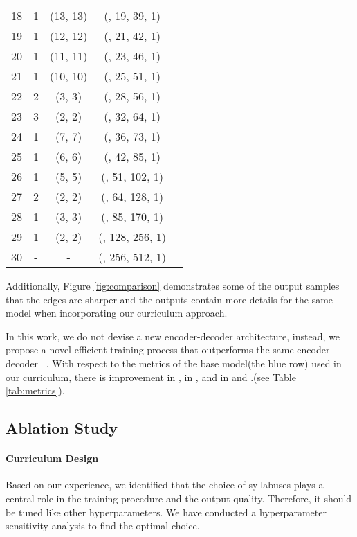 \documentclass{article}
\begin{document}
\begin{table}[H]
\begin{center}
\begin{tabular}{ccccc}
18         &1  &(13, 13)    &(, 19, 39, 1)& \\
19         &1  &(12, 12)    &(, 21, 42, 1)& \\
20         &1  &(11, 11)    &(, 23, 46, 1)& \\
21         &1  &(10, 10)    &(, 25, 51, 1)& \\
22         &2    &(3, 3)    &(, 28, 56, 1)& \\
23         &3    &(2, 2)    &(, 32, 64, 1)& \\
24         &1    &(7, 7)    &(, 36, 73, 1)& \\
25         &1    &(6, 6)    &(, 42, 85, 1)& \\
26         &1    &(5, 5)   &(, 51, 102, 1)& \\
27         &2    &(2, 2)   &(, 64, 128, 1)& \\
28         &1    &(3, 3)   &(, 85, 170, 1)& \\
29         &1    &(2, 2)  &(, 128, 256, 1)& \\
30         &-    & -  &(, 256, 512, 1)& \\
\hline
\end{tabular}
\end{center}
\end{table}

Additionally, Figure \ref{fig:comparison} demonstrates some of the output samples that the edges are sharper and the outputs contain more details for the same model when incorporating our curriculum approach.

In this work, we do not devise a new encoder-decoder architecture, instead, we propose a novel efficient training process that outperforms the same encoder-decoder ~\cite{alhashim2018high}. With respect to the metrics of the base model(the blue row) used in our curriculum, there is  improvement in ,  in ,  and  in  and .(see Table \ref{tab:metrics}).


\subsection{Ablation Study}
\label{sec:ablation_study}

\paragraph{Curriculum Design}
Based on our experience, we identified that the choice of syllabuses plays a central role in the training procedure and the output quality. Therefore, it should be tuned like other hyperparameters. We have conducted a hyperparameter sensitivity analysis to find the optimal choice.
\end{document}
